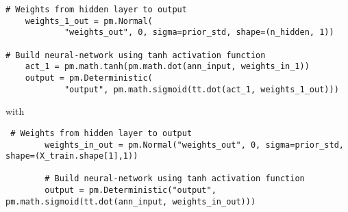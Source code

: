 \begin{appendices}
\begin{lstlisting}
# Weights from hidden layer to output
    weights_1_out = pm.Normal(
            "weights_out", 0, sigma=prior_std, shape=(n_hidden, 1))

# Build neural-network using tanh activation function
    act_1 = pm.math.tanh(pm.math.dot(ann_input, weights_in_1))
    output = pm.Deterministic(
            "output", pm.math.sigmoid(tt.dot(act_1, weights_1_out)))
\end{lstlisting}
with 
\begin{lstlisting}
 # Weights from hidden layer to output
        weights_in_out = pm.Normal("weights_out", 0, sigma=prior_std, shape=(X_train.shape[1],1))

        # Build neural-network using tanh activation function
        output = pm.Deterministic("output", pm.math.sigmoid(tt.dot(ann_input, weights_in_out)))
\end{lstlisting}






\end{appendices}
